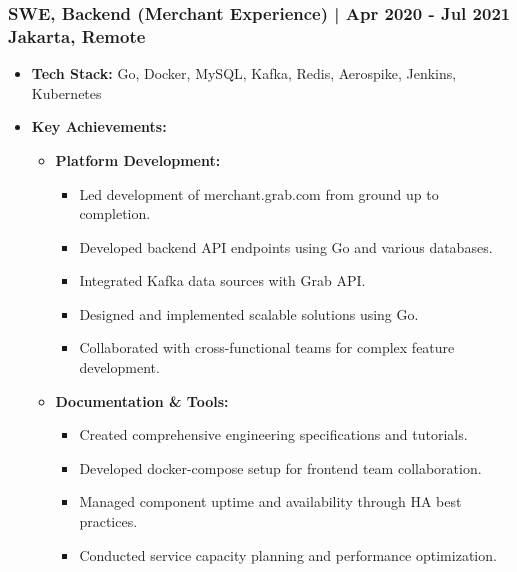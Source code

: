 \documentclass[11pt]{article}
\begin{document}
\subsubsection{SWE, Backend (Merchant Experience) | Apr 2020 - Jul 2021 \hfill Jakarta, Remote}
\begin{itemize}
    \item \textbf{Tech Stack:} Go, Docker, MySQL, Kafka, Redis, Aerospike, Jenkins, Kubernetes
    \item \textbf{Key Achievements:}
    \begin{itemize}
        \item \textbf{Platform Development:}
        \begin{itemize}
            \item Led development of merchant.grab.com from ground up to completion.
            \item Developed backend API endpoints using Go and various databases.
            \item Integrated Kafka data sources with Grab API.
            \item Designed and implemented scalable solutions using Go.
            \item Collaborated with cross-functional teams for complex feature development.
        \end{itemize}
        \item \textbf{Documentation \& Tools:}
        \begin{itemize}
            \item Created comprehensive engineering specifications and tutorials.
            \item Developed docker-compose setup for frontend team collaboration.
            \item Managed component uptime and availability through HA best practices.
            \item Conducted service capacity planning and performance optimization.
        \end{itemize}
    \end{itemize}
\end{itemize}
\end{document}
